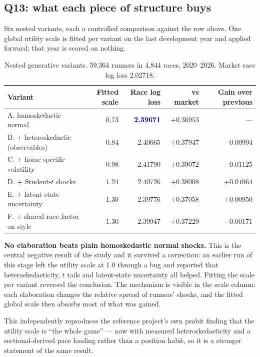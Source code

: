 \documentclass[11pt,a4paper]{article}
\newcommand{\good}[1]{\textcolor{darkblue}{\textbf{#1}}}
\newcommand{\bad}[1]{\textcolor{warm}{\textbf{#1}}}
\begin{document}
\subsection{Q13: what each piece of structure buys}

Six nested variants, each a controlled comparison against the row above. One
global utility scale is fitted per variant on the last development year and applied
forward; that year is scored on nothing.

\begin{table}[htbp]\centering\small
\caption{Nested generative variants. 59{,}364 runners in 4{,}844 races, 2020--2026.
Market race log loss 2.02718.}
\begin{tabular}{lrrrr}
\toprule
Variant & Fitted scale & Race log loss & vs market & Gain over previous\\
\midrule
A. homoskedastic normal & 0.73 & \good{2.39671} & $+0.36953$ & ---\\
B. $+$ heteroskedastic (observables) & 0.84 & 2.40665 & $+0.37947$ & \bad{$-0.00994$}\\
C. $+$ horse-specific volatility & 0.98 & 2.41790 & $+0.39072$ & \bad{$-0.01125$}\\
D. $+$ Student-$t$ shocks & 1.24 & 2.40726 & $+0.38008$ & $+0.01064$\\
E. $+$ latent-state uncertainty & 1.30 & 2.39776 & $+0.37058$ & $+0.00950$\\
F. $+$ shared race factor on style & 1.30 & 2.39947 & $+0.37229$ & \bad{$-0.00171$}\\
\bottomrule
\end{tabular}
\end{table}

\textbf{No elaboration beats plain homoskedastic normal shocks.} This is the
central negative result of the study and it survived a correction: an earlier run
of this stage left the utility scale at 1.0 through a bug and reported that
heteroskedasticity, $t$ tails and latent-state uncertainty all helped. Fitting the
scale per variant reversed the conclusion. The mechanism is visible in the scale
column: each elaboration changes the relative spread of runners' shocks, and the
fitted global scale then absorbs most of what was gained.

This independently reproduces the reference project's own probit finding that the
utility scale is ``the whole game'' --- now with measured heteroskedasticity and a
sectional-derived pace loading rather than a position habit, so it is a stronger
statement of the same result.
\end{document}
